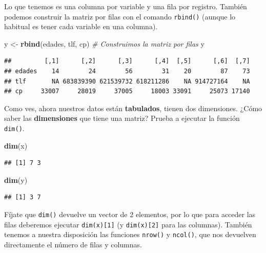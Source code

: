 \documentclass[11pt,]{book}
\newenvironment{Shaded}{\begin{snugshade}}{\end{snugshade}}
\newcommand{\CommentTok}[1]{\textcolor[rgb]{0.37,0.37,0.37}{\textit{#1}}}
\newcommand{\KeywordTok}[1]{\textcolor[rgb]{0.27,0.27,0.27}{\textbf{#1}}}
\newcommand{\NormalTok}[1]{#1}
\newcommand{\StringTok}[1]{\textcolor[rgb]{0.5,0.5,0.5}{#1}}
\begin{document}
Lo que tenemos es una columna por variable y una fila por registro. También podemos construir la matriz por filas con el comando \texttt{rbind()} (aunque lo habitual es tener cada variable en una columna).

\begin{Shaded}
\begin{Highlighting}[]
\NormalTok{y <-}\StringTok{ }\KeywordTok{rbind}\NormalTok{(edades, tlf, cp) }\CommentTok{# Construimos la matriz por filas}
\NormalTok{y}
\end{Highlighting}
\end{Shaded}

\begin{verbatim}
##         [,1]      [,2]      [,3]      [,4]  [,5]      [,6]  [,7]
## edades    14        24        56        31    20        87    73
## tlf       NA 683839390 621539732 618211286    NA 914727164    NA
## cp     33007     28019     37005     18003 33091     25073 17140
\end{verbatim}

Como ves, ahora nuestros datos están \textbf{tabulados}, tienen dos dimensiones. ¿Cómo saber las \textbf{dimensiones} que tiene una matriz? Prueba a ejecutar la función \texttt{dim()}.

\begin{Shaded}
\begin{Highlighting}[]
\KeywordTok{dim}\NormalTok{(x)}
\end{Highlighting}
\end{Shaded}

\begin{verbatim}
## [1] 7 3
\end{verbatim}

\begin{Shaded}
\begin{Highlighting}[]
\KeywordTok{dim}\NormalTok{(y)}
\end{Highlighting}
\end{Shaded}

\begin{verbatim}
## [1] 3 7
\end{verbatim}

Fíjate que \texttt{dim()} devuelve un vector de 2 elementos, por lo que para acceder las filas deberemos ejecutar \texttt{dim(x){[}1{]}} (y \texttt{dim(x){[}2{]}} para las columnas). También tenemos a nuestra disposición las funciones \texttt{nrow()} y \texttt{ncol()}, que nos devuelven directamente el número de filas y columnas.
\end{document}
